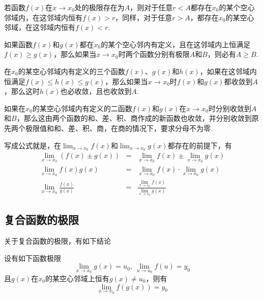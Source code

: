 \begin{theorem}[局部保号性]
  若函数$f(x)$在$x \to x_0$处的极限存在为$A$，则对于任意$r<A$都存在$x_0$的某个空心邻域内，在这邻域内恒有$f(x)>r$，同样，对于任意$r>A$，都存在$x_0$的某空心邻域，在这邻域内恒有$f(x)<r$.
\end{theorem}

\begin{theorem}[保不等式性]
 如果函数$f(x)$和$g(x)$都在$x_0$的某个空心邻内有定义，且在这邻域内上恒满足$f(x) \geqslant g(x)$，那么如果当$x \to x_0$时两个函数分别有极限$A$和$B$，则必有$A \geqslant B$.
\end{theorem}

\begin{theorem}[夹逼定理]
  在$x_0$的某空心邻域内有定义的三个函数$f(x)$、$g(x)$和$h(x)$，如果在这邻域内恒满足$f(x) \leqslant h(x) \leqslant g(x)$，那么如果当$x \to x_0$时$f(x)$和$g(x)$都收敛到$A$，那么这时$h(x)$也必收敛，且也收敛到$A$.
\end{theorem}

\begin{theorem}[四则运算法则]
  如果在$x_0$的某空心邻域内有定义的二函数$f(x)$和$g(x)$在$x \to x_0$时分别收敛到$A$和$B$，那么这由两个函数的和、差、积、商作成的新函数也收敛，并分别收敛到原先两个极限值和和、差、积、商，在商的情况下，要求分母不为零.
\end{theorem}

写成公式就是，在$\lim_{x \to x_0} f(x)$和$\lim_{x \to x_0}g(x)$都存在的前提下，有
\begin{eqnarray*}
  \lim_{x \to x_0} (f(x) \pm g(x)) & = & \lim_{x \to x_0} f(x) \pm \lim_{x \to x_0} g(x)  \\
  \lim_{x \to x_0} f(x)g(x) & = & \lim_{x \to x_0} f(x) \cdot \lim_{x \to x_0} g(x)  \\
  \lim_{x \to x_0} \frac{f(x)}{g(x)} & = & \frac{\lim_{x \to x_0} f(x)}{\lim_{x \to x_0} g(x)}  
\end{eqnarray*}

\subsection{复合函数的极限}
\label{sec:limit-of-composite-function}

关于复合函数的极限，有如下结论
\begin{theorem}
  \label{theorem:limit-of-combine-function}
  设有如下函数极限
  \[ \lim_{x \to x_0}g(x) = u_0, \  \lim_{u \to u_0}f(u) = y_0 \]
  且$g(x)$在$x_0$的某空心邻域上恒有$g(x) \neq u_0$，则有
  \[ \lim_{x \to x_0} f(g(x))=y_0 \]
\end{theorem}

